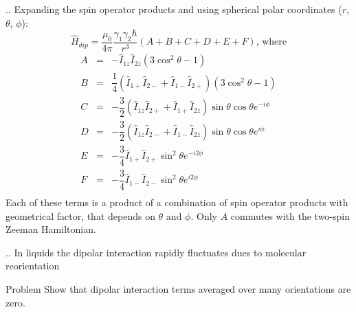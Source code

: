 \documentclass{beamer}
\begin{document}
\begin{frame}{\thesection.\thesubsection. \insertsubsection}
	Expanding the spin operator products and using spherical polar coordinates ($r$, $\theta$, $\phi$):
	\begin{equation}
	\hat{H}_{dip} = \dfrac{\mu_0}{4 \pi} \dfrac{\gamma_1 \gamma_2 \hbar}{r^3} (A+B+C+D+E+F)  \text{, where} 
	\end{equation}
	\begin{equation}
	\begin{array}{cll}
	   A &=& -\hat{I}_{1z} \hat{I}_{2z} (3 \cos^2 \theta - 1) \\
	   B &=& \dfrac{1}{4} ( \hat{I}_{1+} \hat{I}_{2-} + \hat{I}_{1-} \hat{I}_{2+}) (3 \cos^2 \theta - 1) \\
	   C &=& -\dfrac{3}{2} ( \hat{I}_{1z} \hat{I}_{2+} + \hat{I}_{1+} \hat{I}_{2z}) \sin \theta \cos \theta e^{-i\phi} \\
   	   D &=& -\dfrac{3}{2} ( \hat{I}_{1z} \hat{I}_{2-} + \hat{I}_{1-} \hat{I}_{2z}) \sin \theta \cos \theta e^{i\phi} \\
   	   E &=& -\dfrac{3}{4} \hat{I}_{1+} \hat{I}_{2+} \sin^2 \theta e^{-i 2 \phi} \\
   	   F &=& -\dfrac{3}{4} \hat{I}_{1-} \hat{I}_{2-} \sin^2 \theta e^{i 2 \phi} \\
	\end{array}
	\end{equation}
	Each of these terms is a product of a combination of spin operator products with geometrical factor, that depends on $\theta$ and $\phi$. Only $A$ commutes with the two-spin Zeeman Hamiltonian.
\end{frame}

\begin{frame}{\thesection.\thesubsection. \insertsubsection}
	In liquids the dipolar interaction rapidly fluctuates dues to molecular reorientation
	\begin{block}{Problem}
		Show that dipolar interaction terms averaged over many orientations are zero.
	\end{block}
\end{frame}
\end{document}
